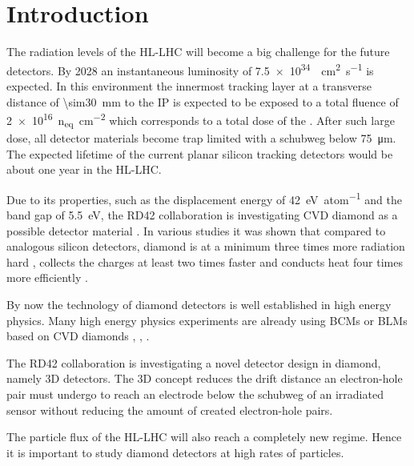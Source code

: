 \section{Introduction}
The radiation levels of the \ac{HL-LHC} will become a big challenge for the future detectors. By 2028 an instantaneous luminosity of \SI{7.5e34}{\per\centi\meter\squared\per\second} is expected. In this environment the innermost tracking layer at a transverse distance of \SI{\sim30}{\milli\meter} to the \acl{IP} is expected to be exposed to a total fluence of \SI{2e16}{n_{eq}\per\centi\meter^2} which corresponds to a total dose of the  \cite{dose}. After such large dose, all detector materials become trap limited with a schubweg below \SI{75}{\micro\meter}.  The expected lifetime of the current planar silicon tracking detectors would be about one year in the \ac{HL-LHC}.\par
Due to its properties, such as the displacement energy of \SI{42}{\electronvolt\per atom} and the band gap of \SI{5.5}{\electronvolt}, the RD42 collaboration is investigating \ac{CVD} diamond as a possible detector material \cite{rd42}. In various studies it was shown that compared to analogous silicon detectors, diamond is at a minimum three times more radiation hard \cite{deboer}, collects the charges at least two times faster \cite{pernegger} and conducts heat four times more efficiently \cite{zhao}.\par
By now the technology of diamond detectors is well established in high energy physics. Many high energy physics experiments are already using \aclp{BCM} or \aclp{BLM} based on \ac{CVD} diamonds \cite{babar}, \cite{bcm}, \cite{dbm1}.\par
The RD42 collaboration is investigating a novel detector design in diamond, namely 3D detectors. The 3D concept reduces the drift distance an electron-hole pair must undergo to reach an electrode below the schubweg of an irradiated sensor without reducing the amount of created electron-hole pairs.\par
The particle flux of the \ac{HL-LHC} will also reach a completely new regime. Hence it is important to study diamond detectors at high rates of particles.
